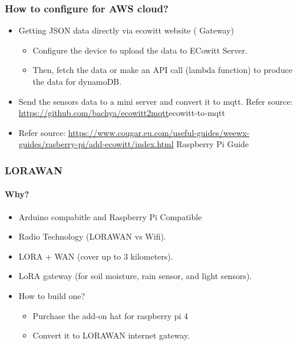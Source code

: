 \documentclass{beamer}
\begin{document}
\begin{frame}
  \frametitle{How to configure for AWS cloud?}
  \begin{itemize}
    \item Getting JSON data directly via ecowitt website ( Gateway)
      \begin{itemize}
        \item Configure the device to upload the data to ECowitt Server.
	\item Then, fetch the data or make an API call (lambda function) to produce the data for dynamoDB.
      \end{itemize}
    \item Send the sensors data to a mini server and convert it to mqtt. Refer source: \url{https://github.com/bachya/ecowitt2mqtt}{ecowitt-to-mqtt}
    \item Refer source: \url{https://www.cougar.eu.com/useful-guides/weewx-guides/rasberry-pi/add-ecowitt/index.html} {Raspberry Pi Guide}
  \end{itemize}

\end{frame}

\begin{frame}
  \frametitle{LORAWAN}
  \framesubtitle{Why?}
  \begin{itemize}
    \item  Arduino compabitle and Raspberry Pi Compatible
    \item  Radio Technology (LORAWAN vs Wifi).
    \item  LORA + WAN (cover up to 3 kilometers).
    \item  LoRA gateway (for soil moisture, rain sensor, and light sensors).
    \item  How to build one?
    \begin{itemize}
      \item Purchase the add-on hat for raspberry pi 4
      \item Convert it to LORAWAN internet gateway.
    \end{itemize}
  \end{itemize}

 \end{frame}
\end{document}
